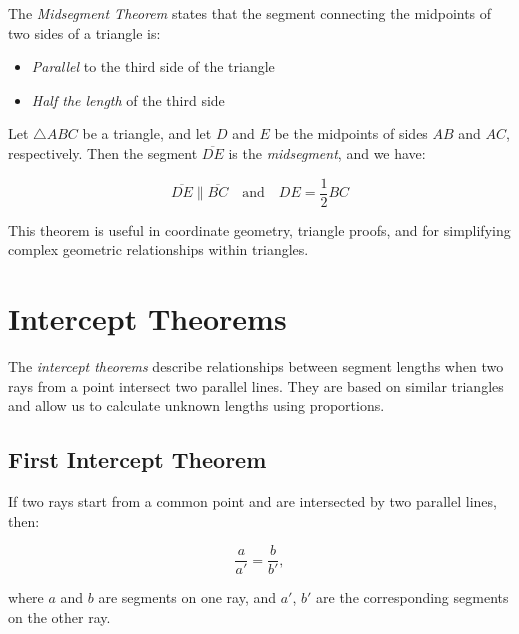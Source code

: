 The \emph{Midsegment Theorem} states that the segment connecting the midpoints of two sides of a triangle 
is:

\begin{itemize}

	\item \emph{Parallel} to the third side of the triangle

	\item \emph{Half the length} of the third side

\end{itemize}

Let \( \triangle ABC \) be a triangle, and let \( D \) and \( E \) be the 
midpoints of sides \( AB \) and \( AC \), respectively. Then the segment \( \overline{DE} \) is 
the \emph{midsegment}, and we have:

\[
	\overline{DE} \parallel \overline{BC} \quad \text{and} \quad DE = \frac{1}{2} BC
\]

This theorem is useful in coordinate geometry, triangle proofs, 
and for simplifying complex geometric relationships within triangles.

\section{Intercept Theorems}

The \emph{intercept theorems} describe relationships between segment lengths when two rays from a point intersect 
two parallel lines. They are based on similar triangles and allow us to calculate unknown lengths using 
proportions.

\subsection{First Intercept Theorem}

If two rays start from a common point and are intersected by two parallel lines, then:

\[
	\frac{a}{a'} = \frac{b}{b'},
\]

where \(a\) and \(b\) are segments on one ray, and \(a'\), \(b'\) are the corresponding segments on the 
other ray.

